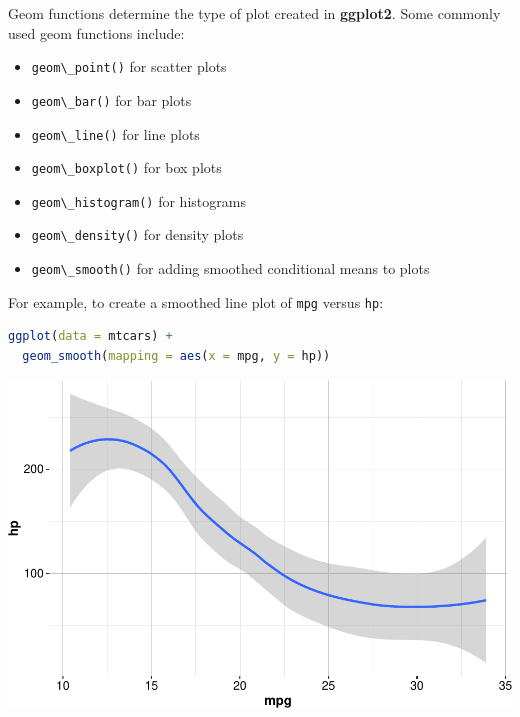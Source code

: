 \documentclass[
]{book}
\newcommand{\passthrough}[1]{#1}
\providecommand{\tightlist}{%
  \setlength{\itemsep}{0pt}\setlength{\parskip}{0pt}}
\theoremstyle{definition}
\theoremstyle{definition}
\theoremstyle{definition}
\theoremstyle{definition}
\theoremstyle{remark}
\begin{document}
Geom functions determine the type of plot created in \textbf{ggplot2}. Some commonly used geom functions include:

\begin{itemize}
\tightlist
\item
  \passthrough{\lstinline!geom\_point()!} for scatter plots\\
\item
  \passthrough{\lstinline!geom\_bar()!} for bar plots\\
\item
  \passthrough{\lstinline!geom\_line()!} for line plots\\
\item
  \passthrough{\lstinline!geom\_boxplot()!} for box plots\\
\item
  \passthrough{\lstinline!geom\_histogram()!} for histograms\\
\item
  \passthrough{\lstinline!geom\_density()!} for density plots\\
\item
  \passthrough{\lstinline!geom\_smooth()!} for adding smoothed conditional means to plots
\end{itemize}

For example, to create a smoothed line plot of \passthrough{\lstinline!mpg!} versus \passthrough{\lstinline!hp!}:

\begin{lstlisting}[language=R]
ggplot(data = mtcars) +
  geom_smooth(mapping = aes(x = mpg, y = hp))
\end{lstlisting}

\begin{center}\includegraphics{Intro-R_files/figure-latex/unnamed-chunk-34-1} \end{center}
\end{document}
